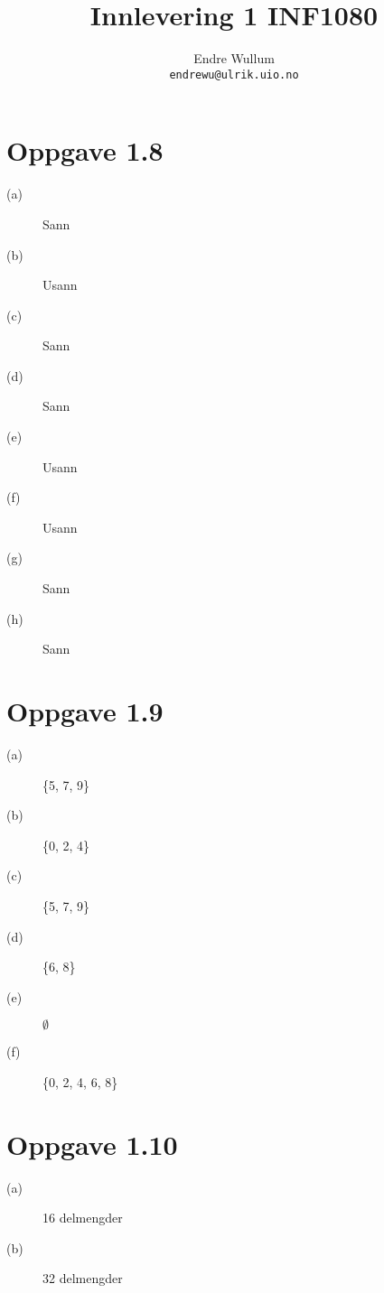 \documentclass[norsk,a4paper]{article}
\title{Innlevering 1 INF1080}
\author{Endre Wullum\\ \texttt{endrewu@ulrik.uio.no}}
\begin{document}
\maketitle

\section*{Oppgave 1.8}

\begin{description}
\item[(a)] Sann
\item[(b)] Usann
\item[(c)] Sann
\item[(d)] Sann
\item[(e)] Usann
\item[(f)] Usann
\item[(g)] Sann
\item[(h)] Sann
\end{description}

\section*{Oppgave 1.9}

\begin{description}
\item[(a)] \{5, 7, 9\}
\item[(b)] \{0, 2, 4\}
\item[(c)] \{5, 7, 9\}
\item[(d)] \{6, 8\}
\item[(e)] $\emptyset$ 
\item[(f)] \{0, 2, 4, 6, 8\}
\end{description}

\section*{Oppgave 1.10}

\begin{description}
\item[(a)] 16 delmengder
\item[(b)] 32 delmengder
\end{description}


\end{document}
